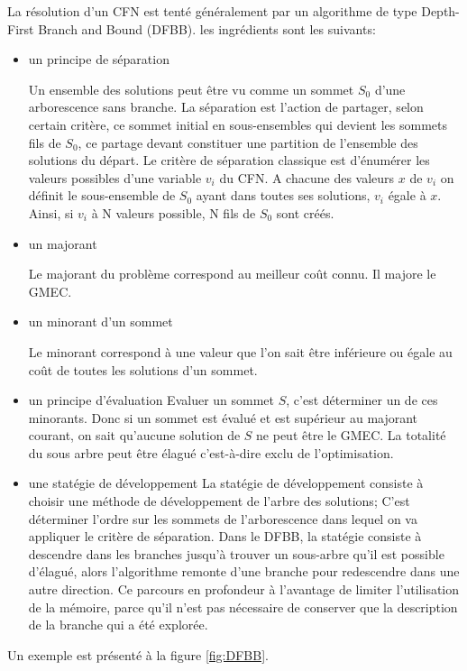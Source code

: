 La résolution d'un CFN est tenté généralement par un algorithme de type  \og Depth-First Branch and Bound \fg (DFBB).
les ingrédients sont les suivants:
\begin{itemize}
\item un principe de séparation

Un ensemble des solutions peut être vu comme un sommet $S_0$ d'une arborescence sans branche.  
La séparation est l'action de partager, selon certain critère, ce sommet initial en sous-ensembles  qui devient les sommets fils de $S_0$, ce partage devant constituer une partition de l'ensemble des solutions du départ.
Le critère de séparation classique est d'énumérer les valeurs possibles d'une variable $v_i$ du  CFN. A chacune des valeurs $x$ de $v_i$ on définit le sous-ensemble de $S_0$ ayant dans toutes ses solutions, $v_i$ égale à $x$. Ainsi, si $v_i$ à N valeurs possible, N fils de $S_0$ sont créés.
\item un majorant
  
Le majorant du problème correspond au meilleur coût connu. Il majore le GMEC.
\item un minorant d'un sommet

Le minorant correspond à une valeur que l'on sait être inférieure ou égale au coût de toutes les solutions d'un sommet.  
\item un principe d'évaluation
Evaluer un sommet $S$, c'est déterminer un de ces minorants. Donc si un sommet est évalué et est supérieur au majorant courant, on sait qu'aucune solution de $S$ ne peut être le GMEC. La totalité du sous arbre peut être élagué c'est-à-dire exclu de l'optimisation.  

\item une statégie de développement
La statégie de développement consiste à choisir une méthode de développement de l'arbre des solutions; C'est déterminer l'ordre sur les sommets de l'arborescence dans lequel on va appliquer le critère de séparation.
Dans le DFBB, la statégie consiste à descendre dans les branches jusqu'à trouver un sous-arbre qu'il est possible d'élagué, alors l'algorithme remonte d'une branche pour redescendre dans une autre direction. Ce parcours en profondeur à l'avantage de limiter l'utilisation de la mémoire, parce qu'il n'est pas nécessaire de conserver que la description de la branche qui a été explorée.
\end{itemize}  
Un exemple est présenté à la figure \ref{fig:DFBB}.


